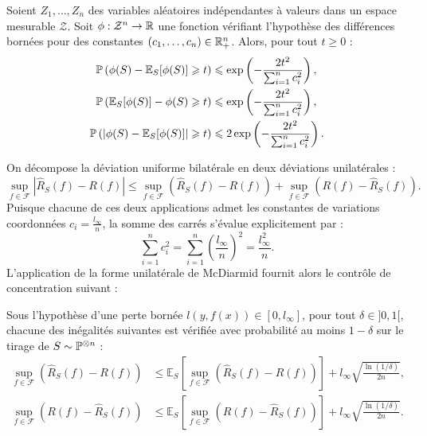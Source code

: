 \begin{theorem}
    Soient $Z_1, \dots, Z_n$ des variables aléatoires indépendantes à valeurs dans un espace mesurable $\mathcal{Z}$. Soit $\phi : \mathcal{Z}^n \to \mathbb{R}$ une fonction vérifiant l'hypothèse des différences bornées pour des constantes $(c_1, \dots, c_n) \in \mathbb{R}_+^n$. Alors, pour tout $t \geqslant 0$ :
    \begin{align}
        \mathbb{P}\left( \phi(S) - \mathbb{E}_S[\phi(S)] \geqslant t \right) &\leqslant \exp\left( -\frac{2t^2}{\sum_{i=1}^n c_i^2} \right), \\
        \mathbb{P}\left( \mathbb{E}_S[\phi(S)] - \phi(S) \geqslant t \right) &\leqslant \exp\left( -\frac{2t^2}{\sum_{i=1}^n c_i^2} \right), \\
        \mathbb{P}\left( |\phi(S) - \mathbb{E}_S[\phi(S)]| \geqslant t \right) &\leqslant 2 \exp\left( -\frac{2t^2}{\sum_{i=1}^n c_i^2} \right).
    \end{align}
\end{theorem}

On décompose la déviation uniforme bilatérale en deux déviations unilatérales :
\begin{equation}
    \sup_{f \in \mathcal{F}} |\hat{R}_S(f) - R(f)| \leqslant \sup_{f \in \mathcal{F}} (\hat{R}_S(f) - R(f)) + \sup_{f \in \mathcal{F}} (R(f) - \hat{R}_S(f)).
\end{equation}
Puisque chacune de ces deux applications admet les constantes de variations coordonnées $c_i = \frac{l_\infty}{n}$, la somme des carrés s'évalue explicitement par :
\begin{equation}
    \sum_{i=1}^n c_i^2 = \sum_{i=1}^n \left(\frac{l_\infty}{n}\right)^2 = \frac{l_\infty^2}{n}.
\end{equation}
L'application de la forme unilatérale de McDiarmid fournit alors le contrôle de concentration suivant :

\begin{proposition}
    Sous l'hypothèse d'une perte bornée $l(y, f(x)) \in [0, l_\infty]$, pour tout $\delta \in ]0, 1[$, chacune des inégalités suivantes est vérifiée avec probabilité au moins $1 - \delta$ sur le tirage de $S \sim \mathbb{P}^{\otimes n}$ :
    \begin{align}
        \sup_{f \in \mathcal{F}} (\hat{R}_S(f) - R(f)) &\leqslant \mathbb{E}_S \left[ \sup_{f \in \mathcal{F}} (\hat{R}_S(f) - R(f)) \right] + l_\infty \sqrt{\frac{\ln(1/\delta)}{2n}}, \\
        \sup_{f \in \mathcal{F}} (R(f) - \hat{R}_S(f)) &\leqslant \mathbb{E}_S \left[ \sup_{f \in \mathcal{F}} (R(f) - \hat{R}_S(f)) \right] + l_\infty \sqrt{\frac{\ln(1/\delta)}{2n}}.
    \end{align}
\end{proposition}

